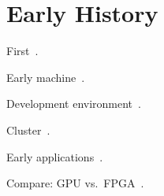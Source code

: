 \section{Early History}
\label{sec:history}

First~\cite{khdo06}.

Early machine~\cite{kdh+06}.

Development environment~\cite{cft+10}.

Cluster~\cite{tl10}.

Early applications~\cite{khdo06,shsc08,tl10}.

Compare: GPU vs.~FPGA~\cite{bnw+10,cz09,jpbc10,sww+10,tb10}.
